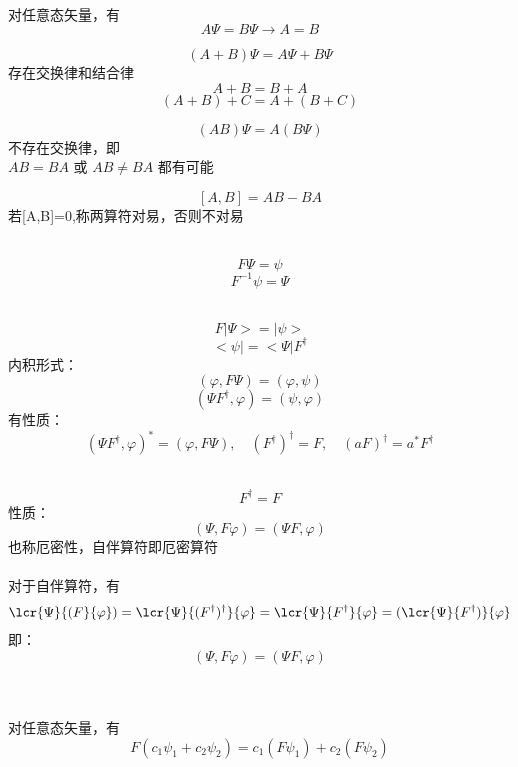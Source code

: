 \begin{frame}
    \emf[算符相等]
        ~~\\
    对任意态矢量，有
        $$ A\Psi=B\Psi \to A=B $$
     
    \emf[算符的和]
        $$ (A+B)\Psi=A\Psi+B\Psi $$
        存在交换律和结合律\\
        $$A+B=B+A$$
        $$(A+B)+C=A+(B+C)$$
     
\end{frame} 

\begin{frame}
    \emf [算符的积]
        $$ (AB)\Psi=A(B\Psi) $$
        不存在交换律，即 \\
        $AB=BA$ 或 $AB\ne BA$ 都有可能
     
    \emf[对易子]
        $$ [A,B]=AB-BA$$
        若[A,B]=0,称两算符对易，否则不对易
     
\end{frame} 

\begin{frame}
    \emf[逆算符]   
        $$ F\Psi=\psi $$
        $$ F^{-1}\psi=\Psi $$
     
    \emf[伴算符] 
        $$ F|\Psi> = |\psi> $$
        $$ <\psi| = <\Psi|F^{\dagger} $$
        内积形式：
        $$ (\varphi,F\Psi)=(\varphi,\psi)$$ 
        $$ (\Psi F^\dagger ,\varphi)=(\psi,\varphi)$$ 
        有性质：
        $$   (\Psi F^\dagger ,\varphi)^* = (\varphi,F\Psi), \quad (F^\dagger)^\dagger =F , \quad (aF)^\dagger = a^* F^\dagger$$
\end{frame} 

\begin{frame} 
    \emf[自伴算符] 
        $$ F^{\dagger} = F $$
        性质：
        $$ (\Psi,F\varphi)=(\Psi F,\varphi) $$ 
        也称厄密性，{\color{red}自伴算符即厄密算符} \\
    ~~\\
    \证 
    对于自伴算符，有
    \[ \begin{aligned}
        \lcr{\Psi}{(F}{\varphi}) = \lcr{\Psi}{(F^\dagger)^\dagger}{\varphi}= \lcr{\Psi}{F^\dagger}{\varphi} = (\lcr{\Psi}{F^\dagger)}{\varphi}
    \end{aligned}\]
    即：$$ (\Psi,F\varphi)=(\Psi F , \varphi) $$
    \end{frame} 

    \begin{frame}     
    ~~\\ 
    \emf[线性算符]
    ~~\\
    对任意态矢量，有\\
        $$F(c_1\psi_1+c_2\psi_2 ) = c_1(F\psi_1)+c_2(F\psi_2 )$$
     
\end{frame} 


